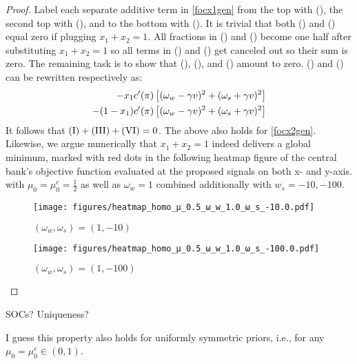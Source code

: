 \documentclass[12pt,a4paper]{article}
\newcommand{\RomanNumeralCaps}[1]{\MakeUppercase{\romannumeral #1}}
\begin{document}
\begin{proof}
    Label each separate additive term in \eqref{focx1gen} from the top with (\RomanNumeralCaps{1}), the second top with (\RomanNumeralCaps{2}), and to the bottom with (\RomanNumeralCaps{7}). It is trivial that both (\RomanNumeralCaps{4}) and (\RomanNumeralCaps{7}) equal zero if plugging $x_1+x_2=1$. All fractions in (\RomanNumeralCaps{2}) and (\RomanNumeralCaps{5}) become one half after substituting $x_1+x_2=1$ so all terms in (\RomanNumeralCaps{2}) and (\RomanNumeralCaps{5}) get canceled out so their sum is zero. The remaining task is to show that  (\RomanNumeralCaps{1}), (\RomanNumeralCaps{3}), and (\RomanNumeralCaps{6}) amount to zero. (\RomanNumeralCaps{3}) and (\RomanNumeralCaps{6}) can be rewritten respectively as:
    \begin{align}
        \small 
        -x_1c^\prime(\pi)\left[(\omega_w-\gamma v)^2+(\omega_s+\gamma v)^2\right] \\
        -(1-x_1)c^\prime(\pi)\left[(\omega_w-\gamma v)^2+(\omega_s+\gamma v)^2\right]
    \end{align}
    It follows that $\mbox{(\RomanNumeralCaps{1})}+\mbox{(\RomanNumeralCaps{3})}+\mbox{(\RomanNumeralCaps{6})}=0$. The above also holds for \eqref{focx2gen}. Likewise, we argue numerically that $x_1+x_2=1$ indeed delivers a global minimum, marked with red dots in the following heatmap figure of the central bank's objective function evaluated at the proposed signals on both x- and y-axis. with $\mu_0=\mu_0^c=\frac{1}{2}$ as well as $\omega_w=1$ combined additionally with $w_s=-10,-100$.
    \begin{figure}[htp!]
    \caption{$(\omega_w,\omega_s)=(1,-10)$}
    \centering
    \texttt{[image: figures/heatmap\_homo\_μ\_0.5\_ω\_w\_1.0\_ω\_s\_-10.0.pdf]}
    \end{figure}
    \begin{figure}[htp!]
    \caption{$(\omega_w,\omega_s)=(1,-100)$}
    \centering
    \texttt{[image: figures/heatmap\_homo\_μ\_0.5\_ω\_w\_1.0\_ω\_s\_-100.0.pdf]}
    \end{figure}
\end{proof}

SOCs? Uniqueness?

I guess this property also holds for uniformly symmetric priors, i.e., for any $\mu_0 = \mu_0^c \in (0,1)$.
\end{document}
